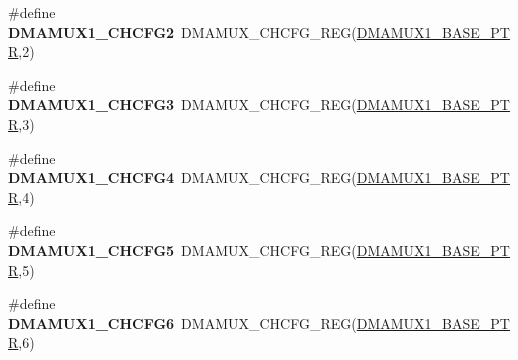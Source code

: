 \begin{DoxyCompactItemize}
\item 
\hypertarget{group___d_m_a_m_u_x___register___accessor___macros_gabcb16138266cd822d492f6a1ed267645}{}\#define {\bfseries D\+M\+A\+M\+U\+X1\+\_\+\+C\+H\+C\+F\+G2}~D\+M\+A\+M\+U\+X\+\_\+\+C\+H\+C\+F\+G\+\_\+\+R\+E\+G(\hyperlink{group___d_m_a_m_u_x___peripheral_gad6b43366c6448bd157f17be565d8e1f3}{D\+M\+A\+M\+U\+X1\+\_\+\+B\+A\+S\+E\+\_\+\+P\+T\+R},2)\label{group___d_m_a_m_u_x___register___accessor___macros_gabcb16138266cd822d492f6a1ed267645}

\item 
\hypertarget{group___d_m_a_m_u_x___register___accessor___macros_gaf7c508238dc58ea3227c67dab999bb73}{}\#define {\bfseries D\+M\+A\+M\+U\+X1\+\_\+\+C\+H\+C\+F\+G3}~D\+M\+A\+M\+U\+X\+\_\+\+C\+H\+C\+F\+G\+\_\+\+R\+E\+G(\hyperlink{group___d_m_a_m_u_x___peripheral_gad6b43366c6448bd157f17be565d8e1f3}{D\+M\+A\+M\+U\+X1\+\_\+\+B\+A\+S\+E\+\_\+\+P\+T\+R},3)\label{group___d_m_a_m_u_x___register___accessor___macros_gaf7c508238dc58ea3227c67dab999bb73}

\item 
\hypertarget{group___d_m_a_m_u_x___register___accessor___macros_ga908e7ac02c810cf3ac81f6ace57d7669}{}\#define {\bfseries D\+M\+A\+M\+U\+X1\+\_\+\+C\+H\+C\+F\+G4}~D\+M\+A\+M\+U\+X\+\_\+\+C\+H\+C\+F\+G\+\_\+\+R\+E\+G(\hyperlink{group___d_m_a_m_u_x___peripheral_gad6b43366c6448bd157f17be565d8e1f3}{D\+M\+A\+M\+U\+X1\+\_\+\+B\+A\+S\+E\+\_\+\+P\+T\+R},4)\label{group___d_m_a_m_u_x___register___accessor___macros_ga908e7ac02c810cf3ac81f6ace57d7669}

\item 
\hypertarget{group___d_m_a_m_u_x___register___accessor___macros_ga55183e63ccd3839b83014742da06c9a4}{}\#define {\bfseries D\+M\+A\+M\+U\+X1\+\_\+\+C\+H\+C\+F\+G5}~D\+M\+A\+M\+U\+X\+\_\+\+C\+H\+C\+F\+G\+\_\+\+R\+E\+G(\hyperlink{group___d_m_a_m_u_x___peripheral_gad6b43366c6448bd157f17be565d8e1f3}{D\+M\+A\+M\+U\+X1\+\_\+\+B\+A\+S\+E\+\_\+\+P\+T\+R},5)\label{group___d_m_a_m_u_x___register___accessor___macros_ga55183e63ccd3839b83014742da06c9a4}

\item 
\hypertarget{group___d_m_a_m_u_x___register___accessor___macros_gac2fab88f37c2f37476f0a545efa011d4}{}\#define {\bfseries D\+M\+A\+M\+U\+X1\+\_\+\+C\+H\+C\+F\+G6}~D\+M\+A\+M\+U\+X\+\_\+\+C\+H\+C\+F\+G\+\_\+\+R\+E\+G(\hyperlink{group___d_m_a_m_u_x___peripheral_gad6b43366c6448bd157f17be565d8e1f3}{D\+M\+A\+M\+U\+X1\+\_\+\+B\+A\+S\+E\+\_\+\+P\+T\+R},6)\label{group___d_m_a_m_u_x___register___accessor___macros_gac2fab88f37c2f37476f0a545efa011d4}


\end{DoxyCompactItemize}

